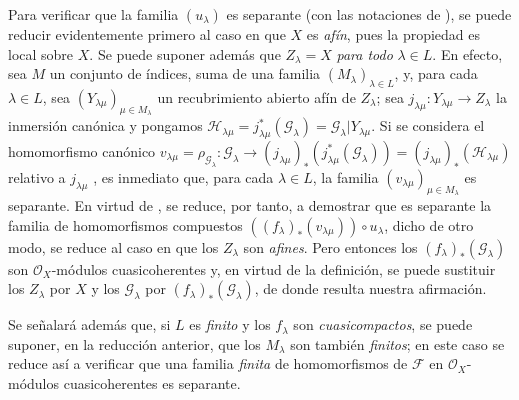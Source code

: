 \begin{env}[11.9.3]
\label{IV.11.9.3}
Para verificar que la familia $(u_\lambda)$ es separante (con las notaciones de ), se puede reducir evidentemente primero al caso en que $X$ es \emph{afín}, pues la propiedad es local sobre $X$.
Se puede suponer además que $Z_\lambda=X$ \emph{para todo} $\lambda\in L$.
En efecto, sea $M$ un conjunto de índices, suma de una familia $(M_\lambda)_{\lambda\in L}$, y, para cada $\lambda\in L$, sea $(Y_{\lambda\mu})_{\mu\in M_\lambda}$ un recubrimiento abierto afín de $Z_\lambda$; sea $j_{\lambda\mu}:Y_{\lambda\mu}\to Z_\lambda$ la inmersión canónica y pongamos $\mathcal H_{\lambda\mu}=j_{\lambda\mu}^*(\mathcal G_\lambda)
=\mathcal G_\lambda|Y_{\lambda\mu}$.
Si se considera el homomorfismo canónico $v_{\lambda\mu}=\rho_{\mathcal G_\lambda}:\mathcal G_\lambda\to
(j_{\lambda\mu})_*(j_{\lambda\mu}^*(\mathcal G_\lambda))
=(j_{\lambda\mu})_*(\mathcal H_{\lambda\mu})$ relativo a $j_{\lambda\mu}$ , es inmediato que, para cada $\lambda\in L$, la familia $(v_{\lambda\mu})_{\mu\in M_\lambda}$ es separante.
En virtud de , se reduce, por tanto, a demostrar que es separante la familia de homomorfismos compuestos $((f_\lambda)_*(v_{\lambda\mu}))\circ u_\lambda$, dicho de otro modo, se reduce al caso en que los $Z_\lambda$ son \emph{afines}.
Pero entonces los $(f_\lambda)_*(\mathcal G_\lambda)$ son $\mathcal O_X$-módulos cuasicoherentes  y, en virtud de la definición, se puede sustituir los $Z_\lambda$ por $X$ y los $\mathcal G_\lambda$ por $(f_\lambda)_*(\mathcal G_\lambda)$, de donde resulta nuestra afirmación.

Se señalará además que, si $L$ es \emph{finito} y los $f_\lambda$ son \emph{cuasicompactos}, se puede suponer, en la reducción anterior, que los $M_\lambda$ son también \emph{finitos}; en este caso se reduce así a verificar que una familia \emph{finita} de homomorfismos de $\mathcal F$ en $\mathcal O_X$-módulos cuasicoherentes es separante.
\end{env}


